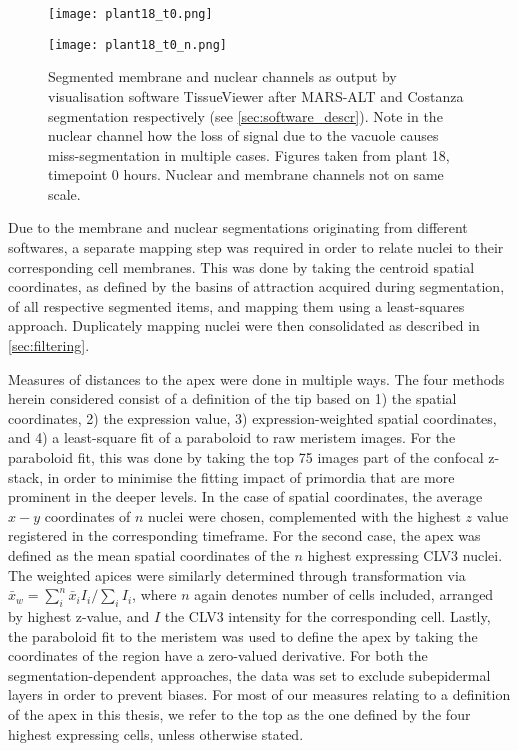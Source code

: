 \begin{figure}[H]
    \centering
    \begin{minipage}{0.49\textwidth}
        \centering
        \texttt{[image: plant18\_t0.png]}
      \end{minipage}\hfill
      \begin{minipage}{.49\textwidth}
        \centering
        \texttt{[image: plant18\_t0\_n.png]}
      \end{minipage}
      \caption[Segmented data]{Segmented membrane and nuclear channels as output by
        visualisation software TissueViewer after MARS-ALT and
        Costanza segmentation respectively (see \cref{sec:software_descr}). Note in the nuclear channel
        how the loss of signal due to the vacuole causes miss-segmentation in
        multiple cases. Figures taken from plant 18, timepoint 0 hours. Nuclear
        and membrane channels not on same scale.}  
\end{figure}

Due to the membrane and nuclear segmentations originating from different
softwares, a separate mapping step was required in order to relate nuclei to
their corresponding cell membranes. This was done by taking the centroid spatial
coordinates, as defined by the basins of attraction acquired during
segmentation, of all respective segmented items, and mapping them using a
least-squares approach. Duplicately mapping nuclei were then
consolidated as described in \cref{sec:filtering}. 

Measures of distances to the apex were done in multiple ways. The four methods
herein considered consist of a definition of the tip based on 1) the spatial
coordinates, 2) the expression value, 3) expression-weighted spatial
coordinates, and 4) a least-square fit of a paraboloid to raw meristem images.
For the paraboloid fit, this was done by taking the top 75 images part of the
confocal z-stack, in order to minimise the fitting impact of primordia that
are more prominent in the deeper levels.
In the case of spatial coordinates, the average $x-y$  
coordinates of $n$ nuclei were chosen, complemented with the highest $z$ value
registered in the corresponding timeframe. For the second case, the apex was
defined as the mean spatial coordinates of the $n$ highest expressing CLV3
nuclei. The weighted apices were similarly determined through transformation via
$\bar{x}_{w} = \sum^{n}_{i} \bar{x}_{i}I_i / \sum_{i} I_i$, where $n$ again denotes number of cells included,
arranged by highest z-value, and $I$ the CLV3 intensity for the
corresponding cell.
Lastly, the paraboloid fit to the meristem was used to define the apex by
taking the coordinates of the region have a zero-valued derivative. For both the
segmentation-dependent approaches, the data was set to exclude subepidermal
layers in order to prevent biases. For most of our measures relating to a
definition of the apex in this thesis, we refer to the top as the one defined by
the four highest expressing cells, unless otherwise stated.

